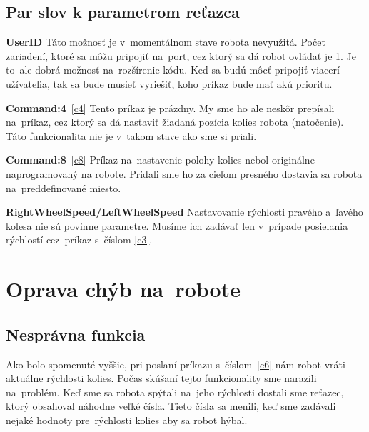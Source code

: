 \subsection{Par slov k parametrom reťazca}

\noindent \textbf{UserID} \newline
\indent Táto možnosť je v~momentálnom stave robota nevyužitá. Počet zariadení, ktoré sa môžu pripojiť na~port, cez ktorý sa dá robot ovládať
je 1. Je to~ale dobrá možnosť na~rozšírenie kódu. Keď sa budú môcť pripojiť viacerí užívatelia, tak sa bude musieť vyriešiť, koho príkaz
bude mať akú prioritu. \newline

\noindent \textbf{Command:4}~\ref{c4} \newline
\indent Tento príkaz je prázdny. My sme ho ale neskôr prepísali na~príkaz, cez ktorý sa dá nastaviť žiadaná pozícia kolies robota (natočenie).
Táto funkcionalita nie je v~takom stave ako sme si priali. \newline

\noindent \textbf{Command:8}~\ref{c8} \newline
\indent Príkaz na~nastavenie polohy kolies nebol originálne naprogramovaný na robote. Pridali sme ho za cieľom presného dostavia sa robota
na~preddefinované miesto. \newline

\noindent \textbf{RightWheelSpeed/LeftWheelSpeed} \newline
\indent Nastavovanie rýchlosti pravého a~ľavého kolesa nie sú povinne parametre. Musíme ich zadávať len v~prípade posielania rýchlostí
cez~príkaz s~číslom \ref{c3}.

\section{Oprava chýb na~robote}

\subsection{Nesprávna funkcia}

Ako bolo spomenuté vyššie, pri poslaní príkazu s~číslom~\ref{c6} nám robot vráti aktuálne rýchlosti kolies. Počas skúšaní tejto funkcionality
sme narazili na~problém. Keď sme sa robota spýtali na~jeho rýchlosti dostali sme reťazec, ktorý obsahoval náhodne veľké čísla. Tieto čísla sa
menili, keď sme zadávali nejaké hodnoty pre~rýchlosti kolies aby sa robot hýbal.

